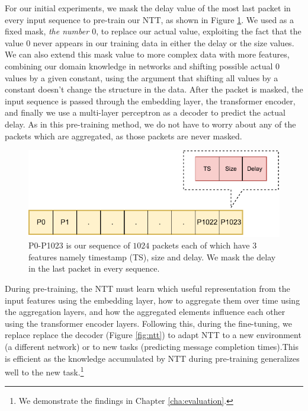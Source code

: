 For our initial experiments, we mask the delay value of the most last packet in every input sequence to pre-train our NTT, as shown in Figure \ref{fig:mask}. We used as a fixed mask, \emph{the number $0$}, to replace our actual value, exploiting the fact that the value $0$ never appears in our training data in either the delay or the size values. We can also extend this mask value to more complex data with more features, combining our domain knowledge in networks and shifting possible actual $0$ values by a given constant, using the argument that shifting all values by a constant doesn't change the structure in the data. After the packet is masked, the input sequence is passed through the embedding layer, the transformer encoder, and finally we use a multi-layer perceptron as a decoder to predict the actual delay. As in this pre-training method, we do not have to worry about any of the packets which are aggregated, as those packets are never masked.

\begin{figure}[h]
  \begin{center}
    \includegraphics[scale=1]{figures/mask.pdf}
    \caption{P0-P1023  is our sequence of $1024$ packets each of which have 3 features namely timestamp (TS), size and delay. We mask the delay in the last packet in every sequence. }
    \label{fig:mask}
  \end{center}
\end{figure}

During pre-training, the NTT must learn which useful representation from the input features using the embedding layer, how to aggregate them over time using the aggregation layers, and how the aggregated elements influence each other using the transformer encoder layers. Following this, during the fine-tuning, we replace replace the decoder (Figure \ref{fig:ntt}) to adapt NTT to a new environment (\eg a different network) or to new tasks (\eg predicting message completion times).This is efficient as the knowledge accumulated by NTT during pre-training generalizes well to the new task.\footnote{We demonstrate the findings in Chapter \ref{cha:evaluation}.}

